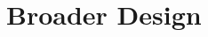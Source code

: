 \documentclass[conference]{IEEEtran}
\newcommand{\DDT}{D\textsuperscript{2}T~}
\begin{document}
%
%

\section{Broader Design}
\label{sec:summary}
\end{document}
